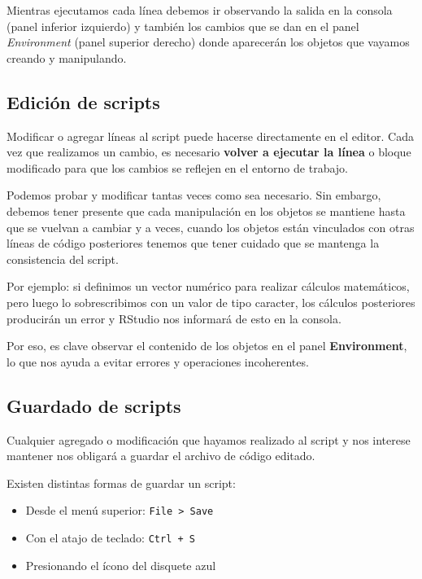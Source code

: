 \documentclass[
  spanish,
  letterpaper,
  DIV=11,
  numbers=noendperiod]{scrreprt}
\begin{document}
Mientras ejecutamos cada línea debemos ir observando la salida en la
consola (panel inferior izquierdo) y también los cambios que se dan en
el panel \emph{Environment} (panel superior derecho) donde aparecerán
los objetos que vayamos creando y manipulando.

\subsection{Edición de scripts}\label{ediciuxf3n-de-scripts}

Modificar o agregar líneas al script puede hacerse directamente en el
editor. Cada vez que realizamos un cambio, es necesario \textbf{volver a
ejecutar la línea} o bloque modificado para que los cambios se reflejen
en el entorno de trabajo.

Podemos probar y modificar tantas veces como sea necesario. Sin embargo,
debemos tener presente que cada manipulación en los objetos se mantiene
hasta que se vuelvan a cambiar y a veces, cuando los objetos están
vinculados con otras líneas de código posteriores tenemos que tener
cuidado que se mantenga la consistencia del script.

Por ejemplo: si definimos un vector numérico para realizar cálculos
matemáticos, pero luego lo sobrescribimos con un valor de tipo caracter,
los cálculos posteriores producirán un error y RStudio nos informará de
esto en la consola.

Por eso, es clave observar el contenido de los objetos en el panel
\textbf{Environment}, lo que nos ayuda a evitar errores y operaciones
incoherentes.

\subsection{Guardado de scripts}\label{guardado-de-scripts}

Cualquier agregado o modificación que hayamos realizado al script y nos
interese mantener nos obligará a guardar el archivo de código editado.

Existen distintas formas de guardar un script:

\begin{itemize}
\item
  Desde el menú superior: \texttt{File\ \textgreater{}\ Save}
\item
  Con el atajo de teclado: \texttt{Ctrl\ +\ S}
\item
  Presionando el ícono del disquete azul 💾
\end{itemize}
\end{document}
